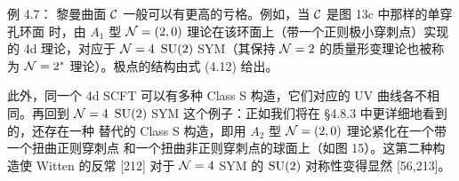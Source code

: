 

\begin{examplebox}{例 4.7：}
  黎曼曲面 $\mathcal{C}$ 一般可以有更高的亏格。例如，当 $\mathcal{C}$ 是图 13c 中那样的单穿孔环面
  时，由 $A_1$ 型 $\mathcal{N}=(2,0)$ 理论在该环面上（带一个正则极小穿刺点）实现的 4d
  理论，对应于 $\mathcal{N}=4$ $\mathrm{SU}(2)$ SYM（其保持 $\mathcal{N}=2$ 的质量形变理论也被称为
  $\mathcal{N}=2^*$ 理论）。极点的结构由式 (4.12) 给出。

  此外，同一个 4d SCFT 可以有多种 Class S 构造，它们对应的 UV 曲线各不相同。再回到
  $\mathcal{N}=4$ $\mathrm{SU}(2)$ SYM 这个例子：正如我们将在 §4.8.3 中更详细地看到的，还存在一种
  替代的 Class S 构造，即用 $A_2$ 型 $\mathcal{N}=(2,0)$ 理论紧化在一个带一个扭曲正则穿刺点
  和一个扭曲非正则穿刺点的球面上（如图 15）。这第二种构造使 Witten 的反常 [212]
  对于 $\mathcal{N}=4$ SYM 的 $\mathrm{SU}(2)$ 对称性变得显然 [56,213]。
\end{examplebox}



